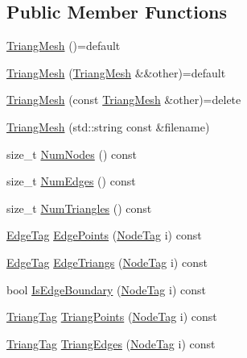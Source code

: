 \subsection*{Public Member Functions}
\begin{DoxyCompactItemize}
\item 
\hyperlink{structTriangMesh_a704b5960ace0f96b30a63d0d757c0a9f}{Triang\+Mesh} ()=default
\item 
\hyperlink{structTriangMesh_adf054ce5bd623c810c9544fb11fc181c}{Triang\+Mesh} (\hyperlink{structTriangMesh}{Triang\+Mesh} \&\&other)=default
\item 
\hyperlink{structTriangMesh_adc8b6dd095f0b5cde9b815fc99550e51}{Triang\+Mesh} (const \hyperlink{structTriangMesh}{Triang\+Mesh} \&other)=delete
\item 
\hyperlink{structTriangMesh_a2fd15d9e2c6fae5a93a8b132744a55e8}{Triang\+Mesh} (std\+::string const \&filename)
\item 
size\+\_\+t \hyperlink{structTriangMesh_ac936e752bedb743c50575c34cdc67d3b}{Num\+Nodes} () const
\item 
size\+\_\+t \hyperlink{structTriangMesh_a058b662444a7cf9e3eaddb4c88886951}{Num\+Edges} () const
\item 
size\+\_\+t \hyperlink{structTriangMesh_a87e9011fee83643dd2b28cadf0116f06}{Num\+Triangles} () const
\item 
\hyperlink{TriangMesh_8h_acc47488d876c8158f668034ca092038b}{Edge\+Tag} \hyperlink{structTriangMesh_a83972b4033aa0941adfbcf07c67d1267}{Edge\+Points} (\hyperlink{structTriangMesh_a9883abab211497b807f24e6e46f4b8f6}{Node\+Tag} i) const
\item 
\hyperlink{TriangMesh_8h_acc47488d876c8158f668034ca092038b}{Edge\+Tag} \hyperlink{structTriangMesh_ab160faebe26585d6a512bcf659113adc}{Edge\+Triangs} (\hyperlink{structTriangMesh_a9883abab211497b807f24e6e46f4b8f6}{Node\+Tag} i) const
\item 
bool \hyperlink{structTriangMesh_af0cc2b0031c1f7a60e0b57e59cf2f770}{Is\+Edge\+Boundary} (\hyperlink{structTriangMesh_a9883abab211497b807f24e6e46f4b8f6}{Node\+Tag} i) const
\item 
\hyperlink{TriangMesh_8h_a278a4a778b70d153092ef4f362ec8bea}{Triang\+Tag} \hyperlink{structTriangMesh_a792914208398af409909bc875b1e901a}{Triang\+Points} (\hyperlink{structTriangMesh_a9883abab211497b807f24e6e46f4b8f6}{Node\+Tag} i) const
\item 
\hyperlink{TriangMesh_8h_a278a4a778b70d153092ef4f362ec8bea}{Triang\+Tag} \hyperlink{structTriangMesh_a41afce57a1ff9c91d513e12ceeaaa30f}{Triang\+Edges} (\hyperlink{structTriangMesh_a9883abab211497b807f24e6e46f4b8f6}{Node\+Tag} i) const

\end{DoxyCompactItemize}
